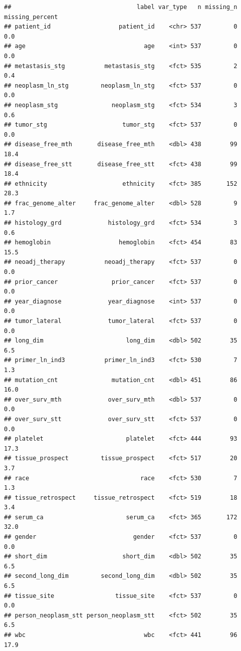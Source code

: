 \documentclass[]{article}
\begin{document}
\begin{verbatim}
##                                   label var_type   n missing_n missing_percent
## patient_id                   patient_id    <chr> 537         0             0.0
## age                                 age    <int> 537         0             0.0
## metastasis_stg           metastasis_stg    <fct> 535         2             0.4
## neoplasm_ln_stg         neoplasm_ln_stg    <fct> 537         0             0.0
## neoplasm_stg               neoplasm_stg    <fct> 534         3             0.6
## tumor_stg                     tumor_stg    <fct> 537         0             0.0
## disease_free_mth       disease_free_mth    <dbl> 438        99            18.4
## disease_free_stt       disease_free_stt    <fct> 438        99            18.4
## ethnicity                     ethnicity    <fct> 385       152            28.3
## frac_genome_alter     frac_genome_alter    <dbl> 528         9             1.7
## histology_grd             histology_grd    <fct> 534         3             0.6
## hemoglobin                   hemoglobin    <fct> 454        83            15.5
## neoadj_therapy           neoadj_therapy    <fct> 537         0             0.0
## prior_cancer               prior_cancer    <fct> 537         0             0.0
## year_diagnose             year_diagnose    <int> 537         0             0.0
## tumor_lateral             tumor_lateral    <fct> 537         0             0.0
## long_dim                       long_dim    <dbl> 502        35             6.5
## primer_ln_ind3           primer_ln_ind3    <fct> 530         7             1.3
## mutation_cnt               mutation_cnt    <dbl> 451        86            16.0
## over_surv_mth             over_surv_mth    <dbl> 537         0             0.0
## over_surv_stt             over_surv_stt    <fct> 537         0             0.0
## platelet                       platelet    <fct> 444        93            17.3
## tissue_prospect         tissue_prospect    <fct> 517        20             3.7
## race                               race    <fct> 530         7             1.3
## tissue_retrospect     tissue_retrospect    <fct> 519        18             3.4
## serum_ca                       serum_ca    <fct> 365       172            32.0
## gender                           gender    <fct> 537         0             0.0
## short_dim                     short_dim    <dbl> 502        35             6.5
## second_long_dim         second_long_dim    <dbl> 502        35             6.5
## tissue_site                 tissue_site    <fct> 537         0             0.0
## person_neoplasm_stt person_neoplasm_stt    <fct> 502        35             6.5
## wbc                                 wbc    <fct> 441        96            17.9
\end{verbatim}
\end{document}

